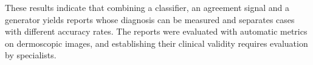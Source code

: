 These results indicate that combining a classifier, an agreement signal and a generator yields reports whose diagnosis
can be measured and separates cases with different accuracy rates. The reports were evaluated with automatic metrics on
dermoscopic images, and establishing their clinical validity requires evaluation by specialists.

